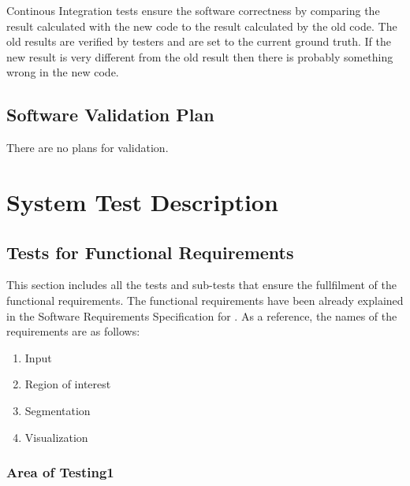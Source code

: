 \documentclass[12pt, titlepage]{article}
\begin{document}
\noindent Continous Integration tests ensure the software correctness by comparing the result calculated with the new code to the result calculated by the old code. The old results are verified by testers and are set to the current ground truth. If the new result is very different from the old result then there is probably something wrong in the new code.\\




\subsection{Software Validation Plan}


There are no plans for validation.

\section{System Test Description}
	
\subsection{Tests for Functional Requirements}
%
%

This section includes all the tests and sub-tests that ensure the fullfilment of the functional requirements. 
The functional requirements have been already explained in the Software Requirements Specification for \progname{}. As a reference, the names of the requirements are as follows:
\begin{enumerate}
\item{Input}
\item{Region of interest}
\item{Segmentation}
\item{Visualization}
\end{enumerate}

\subsubsection{Area of Testing1}
		
\end{document}

